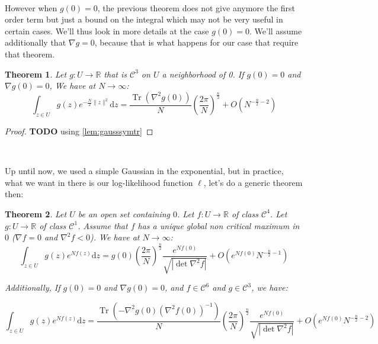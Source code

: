 \documentclass[10pt]{report}
\theoremstyle{plain}
\newtheorem{thm}{Theorem}[chapter]
\theoremstyle{definition}
\theoremstyle{remark}
\newcommand{\R}{\ensuremath{\mathbb{R}}}
\newcommand{\TODO}{\textbf{TODO}}
\newcommand{\dd}{\mathrm{d}}
\DeclareMathOperator{\Tr}{Tr}
\newcommand{\class}[1]{{\mathscr{C}^{#1}}}
\begin{document}
\


However when $g(0) = 0$, the previous theorem does not give anymore the first
order term but just a bound on the integral which may not be very useful in
certain cases. We'll thus look in more details at the case $g(0) = 0$. We'll
assume additionally that $\nabla g = 0$, because that is what happens for our
case that require that theorem.


\begin{thm}\label{thm:asy2}
 Let $g : U \to \R$ that is $\class 3$ on $U$ a neighborhood of 0. If $g(0) = 0$
 and $\nabla g(0) = 0$, We have at $N \to \infty$:
  \[\int_{z \in U} g(z)e^{-\frac N2\|z\|^2} \dd z = \frac{\Tr(\nabla^2 g(0))}N {\left(\frac
        {2\pi}{N}\right)}^{\frac n 2} +
    O\left({N^{-\frac n 2 -2}}\right)\]
\end{thm}

\begin{proof}
\TODO{} using \cref{lem:gausssymtr}
\end{proof}

\

Up until now, we used a simple Gaussian in the exponential, but in practice,
what we want in there is our log-likelihood function $\ell$, let's do a generic
theorem then:

\begin{thm}\label{thm:asymid}
  Let $U$ be an open set containing $0$. Let $f : U \to \R$ of class $\class 4$.
  Let $g : U \to \R$ of class $\class 1$.
  Assume that $f$ has a unique global non critical maximum in $0$
  ($\nabla f = 0$ and $\nabla^2 f < 0$). We have at $N \to \infty$:
  \[\int_{z \in U} g(z)e^{Nf(z)} \dd z = g(0)
    {\left(\frac {2\pi}{N}\right)}^{\frac n 2}
    \frac {e^{Nf(0)}}{\sqrt{\left|\det \nabla^2 f\right|}}
    + O(e^{Nf(0)} N^{-\frac n 2 -1})\]

  Additionally, If $g(0) = 0$ and $\nabla g(0) = 0$, and $f \in \class 6$ and $g
  \in \class 3$, we have:

  \[\int_{z \in U} g(z)e^{N f(z)} \dd z =
    \frac{\Tr\left(-\nabla^2 g(0) {\left(\nabla^2 f(0)\right)}^{-1}\right)}N
    {\left(\frac {2\pi}{N}\right)}^{\frac n 2}
    \frac {e^{Nf(0)}}{\sqrt{\left|\det \nabla^2 f\right|}}
    + O\left(e^{Nf(0)}{N^{-\frac n 2 -2}}\right)\]
\end{thm}
\end{document}
